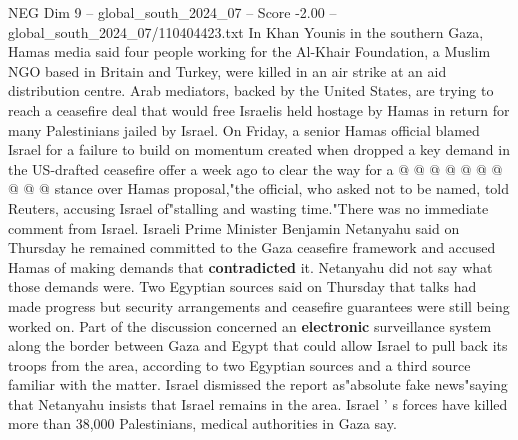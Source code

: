 \begin{textsample}{NEG Dim 9 – global\_south\_2024\_07 – Score -2.00 – global\_south\_2024\_07/110404423.txt}
In Khan Younis in the southern Gaza, Hamas media said four people working for the Al-Khair Foundation, a Muslim NGO based in Britain and Turkey, were killed in an air strike at an aid distribution centre.
Arab mediators, backed by the United States, are trying to reach a ceasefire deal that would free Israelis held hostage by Hamas in return for many Palestinians jailed by Israel.
On Friday, a senior Hamas official blamed Israel for a failure to build on momentum created when dropped a key demand in the US-drafted ceasefire offer a week ago to clear the way for a @ @ @ @ @ @ @ @ @ @ stance over Hamas proposal,"the official, who asked not to be named, told Reuters, accusing Israel of"stalling and wasting time."There was no immediate comment from Israel.
Israeli Prime Minister Benjamin Netanyahu said on Thursday he remained committed to the Gaza ceasefire framework and accused Hamas of making demands that \textbf{contradicted} it.
Netanyahu did not say what those demands were.
Two Egyptian sources said on Thursday that talks had made progress but security arrangements and ceasefire guarantees were still being worked on.
Part of the discussion concerned an \textbf{electronic} surveillance system along the border between Gaza and Egypt that could allow Israel to pull back its troops from the area, according to two Egyptian sources and a third source familiar with the matter.
Israel dismissed the report as"absolute fake news"saying that Netanyahu insists that Israel remains in the area.
Israel ' s forces have killed more than 38,000 Palestinians, medical authorities in Gaza say.

\end{textsample}

